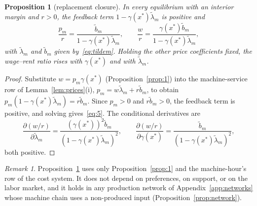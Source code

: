 \documentclass[12pt]{article}
\theoremstyle{plain}
\newtheorem{proposition}{Proposition}
\theoremstyle{definition}
\theoremstyle{remark}
\newtheorem*{remark}{Remark}
\begin{document}
\begin{proposition}[replacement closure]\label{prop:2}
In every equilibrium with an interior margin and $r>0$, the feedback term $1-\gamma(x^*)\widetilde\lambda_m$ is positive and
\begin{equation}\label{eq:5}
\frac{p_m}{r}
=
\frac{\widetilde{b}_m}{1-\gamma(x^*)\widetilde{\lambda}_m},
\qquad
\frac{w}{r}
=
\frac{\gamma(x^*)\widetilde{b}_m}{1-\gamma(x^*)\widetilde{\lambda}_m},
\end{equation}
with $\widetilde\lambda_m$ and $\widetilde b_m$ given by~\eqref{eq:tildem}. Holding the other price coefficients fixed, the wage--rent ratio rises with $\gamma(x^*)$ and with $\widetilde{\lambda}_m$.
\end{proposition}

\begin{proof}
Substitute $w=p_m\gamma(x^*)$ (Proposition~\ref{prop:1}) into the machine-service row of Lemma~\ref{lem:prices}(i), $p_m=w\widetilde\lambda_m+r\widetilde b_m$, to obtain $p_m(1-\gamma(x^*)\widetilde{\lambda}_m)=r\widetilde{b}_m$. Since $p_m>0$ and $r\widetilde b_m>0$, the feedback term is positive, and solving gives~\eqref{eq:5}. The conditional derivatives are
\[
\frac{\partial(w/r)}{\partial\widetilde{\lambda}_m}=\frac{(\gamma(x^*))^2\widetilde{b}_m}{(1-\gamma(x^*)\widetilde{\lambda}_m)^2},\qquad
\frac{\partial(w/r)}{\partial\gamma(x^*)}=\frac{\widetilde{b}_m}{(1-\gamma(x^*)\widetilde{\lambda}_m)^2},
\]
both positive.
\end{proof}

\begin{remark}
Proposition~\ref{prop:2} uses only Proposition~\ref{prop:1} and the machine-hour's row of the cost system. It does not depend on preferences, on support, or on the labor market, and it holds in any production network of Appendix~\ref{app:networks} whose machine chain uses a non-produced input (Proposition~\ref{prop:network}).
\end{remark}
\end{document}
